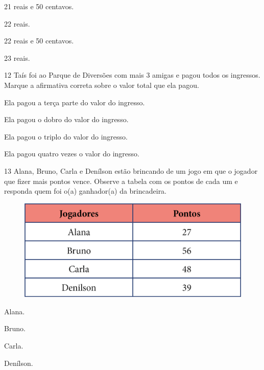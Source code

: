 \begin{escolha}[itemsep=-5pt]
\begin{multicols}{2}
\item 21 reais e 50 centavos.

\item 22 reais.

\item 22 reais e 50 centavos.

\item 23 reais.
\end{multicols}
\end{escolha}

\num{12} Taís foi ao Parque de Diversões com mais 3 amigas e pagou todos os ingressos. Marque a afirmativa correta sobre o valor total que ela pagou.

\begin{escolha}[itemsep=-5pt]
\item Ela pagou a terça parte do valor do ingresso.

\item Ela pagou o dobro do valor do ingresso.

\item Ela pagou o triplo do valor do ingresso.

\item Ela pagou quatro vezes o valor do ingresso.
\end{escolha}

\num{13} Alana, Bruno, Carla e Denílson estão brincando de um jogo em que o
jogador que fizer mais pontos vence. Observe a tabela com os pontos de
cada um e responda quem foi o(a) ganhador(a) da brincadeira.

\begin{figure}[H]
\centering
\includegraphics[width=.7\textwidth]{./media/image121.png}
\end{figure}

\begin{escolha}[itemsep=-5pt]
\item Alana.

\item Bruno.

\item Carla.

\item Denílson.
\end{escolha}

